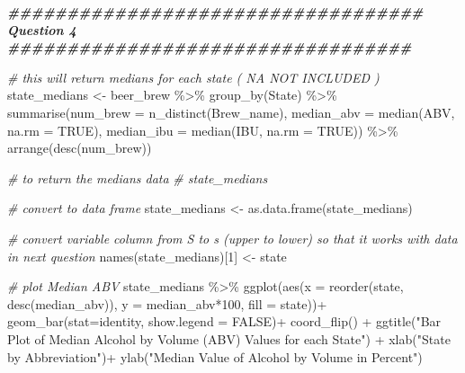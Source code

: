 \documentclass[
]{article}
\newenvironment{Shaded}{\begin{snugshade}}{\end{snugshade}}
\newcommand{\AttributeTok}[1]{\textcolor[rgb]{0.77,0.63,0.00}{#1}}
\newcommand{\CommentTok}[1]{\textcolor[rgb]{0.56,0.35,0.01}{\textit{#1}}}
\newcommand{\ConstantTok}[1]{\textcolor[rgb]{0.00,0.00,0.00}{#1}}
\newcommand{\DecValTok}[1]{\textcolor[rgb]{0.00,0.00,0.81}{#1}}
\newcommand{\DocumentationTok}[1]{\textcolor[rgb]{0.56,0.35,0.01}{\textbf{\textit{#1}}}}
\newcommand{\FunctionTok}[1]{\textcolor[rgb]{0.00,0.00,0.00}{#1}}
\newcommand{\NormalTok}[1]{#1}
\newcommand{\OtherTok}[1]{\textcolor[rgb]{0.56,0.35,0.01}{#1}}
\newcommand{\SpecialCharTok}[1]{\textcolor[rgb]{0.00,0.00,0.00}{#1}}
\newcommand{\StringTok}[1]{\textcolor[rgb]{0.31,0.60,0.02}{#1}}
\begin{document}
\begin{Shaded}
\begin{Highlighting}[]
\DocumentationTok{\#\#\#\#\#\#\#\#\#\#\#\#\#\#\#\#\#\#\#\#\#\#\#\#\#\#\#\#\#\#\#\#\#\#\# Question 4 \#\#\#\#\#\#\#\#\#\#\#\#\#\#\#\#\#\#\#\#\#\#\#\#\#\#\#\#\#\#\#\#\#\#}

\CommentTok{\# this will return medians for each state ( NA NOT INCLUDED )}
\NormalTok{state\_medians }\OtherTok{\textless{}{-}}\NormalTok{ beer\_brew }\SpecialCharTok{\%\textgreater{}\%} \FunctionTok{group\_by}\NormalTok{(State) }\SpecialCharTok{\%\textgreater{}\%}
  \FunctionTok{summarise}\NormalTok{(}\AttributeTok{num\_brew =} \FunctionTok{n\_distinct}\NormalTok{(Brew\_name),}
            \AttributeTok{median\_abv =} \FunctionTok{median}\NormalTok{(ABV, }\AttributeTok{na.rm =} \ConstantTok{TRUE}\NormalTok{), }\AttributeTok{median\_ibu =} \FunctionTok{median}\NormalTok{(IBU, }\AttributeTok{na.rm =} \ConstantTok{TRUE}\NormalTok{)) }\SpecialCharTok{\%\textgreater{}\%}
  \FunctionTok{arrange}\NormalTok{(}\FunctionTok{desc}\NormalTok{(num\_brew))}

\CommentTok{\# to return the medians data}
\CommentTok{\# state\_medians}

\CommentTok{\# convert to data frame}
\NormalTok{state\_medians }\OtherTok{\textless{}{-}} \FunctionTok{as.data.frame}\NormalTok{(state\_medians)}

\CommentTok{\# convert variable column from S to s (upper to lower) so that it works with data in next question}
\FunctionTok{names}\NormalTok{(state\_medians)[}\DecValTok{1}\NormalTok{] }\OtherTok{\textless{}{-}} \StringTok{\textquotesingle{}state\textquotesingle{}}

\CommentTok{\# plot Median ABV}
\NormalTok{state\_medians }\SpecialCharTok{\%\textgreater{}\%} \FunctionTok{ggplot}\NormalTok{(}\FunctionTok{aes}\NormalTok{(}\AttributeTok{x =} \FunctionTok{reorder}\NormalTok{(state, }\FunctionTok{desc}\NormalTok{(median\_abv)), }\AttributeTok{y =}\NormalTok{ median\_abv}\SpecialCharTok{*}\DecValTok{100}\NormalTok{, }\AttributeTok{fill =}\NormalTok{ state))}\SpecialCharTok{+}
  \FunctionTok{geom\_bar}\NormalTok{(}\AttributeTok{stat=}\StringTok{\textquotesingle{}identity\textquotesingle{}}\NormalTok{, }\AttributeTok{show.legend =} \ConstantTok{FALSE}\NormalTok{)}\SpecialCharTok{+}
  \FunctionTok{coord\_flip}\NormalTok{() }\SpecialCharTok{+}
  \FunctionTok{ggtitle}\NormalTok{(}\StringTok{"Bar Plot of Median Alcohol by Volume (ABV) Values for each State"}\NormalTok{) }\SpecialCharTok{+}
  \FunctionTok{xlab}\NormalTok{(}\StringTok{"State by Abbreviation"}\NormalTok{)}\SpecialCharTok{+}
  \FunctionTok{ylab}\NormalTok{(}\StringTok{"Median Value of Alcohol by Volume in Percent"}\NormalTok{)}
\end{Highlighting}
\end{Shaded}
\end{document}
